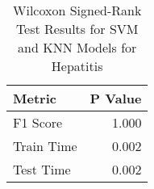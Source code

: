 \begin{table}[!htbp]
\centering
\caption{Wilcoxon Signed-Rank Test Results for SVM and KNN Models for Hepatitis}
\label{tab:svm_knn_wilcoxon_comparison_hepatitis}
\begin{tabular}{lr}
\toprule
Metric & P Value \\
\midrule
F1 Score & 1.000 \\
Train Time & 0.002 \\
Test Time & 0.002 \\
\bottomrule
\end{tabular}
\end{table}
